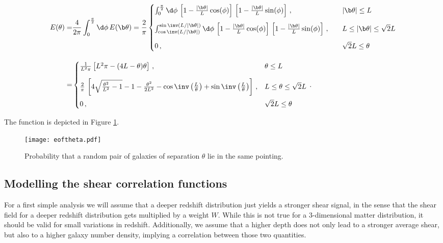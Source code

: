 \begin{align}
E(\theta) = & \frac{4}{2\pi}\int_0^{\frac{\pi}{2}}\d\phi\, E(\b\theta) = \frac{2}{\pi}\begin{cases}
\int_0^{\frac{\pi}{2}} \d\phi\, \left[1-\frac{|\b\theta|}{L}\cos(\phi)\right]\,\left[1-\frac{|\b\theta|}{L}\sin(\phi)\right]\, ,  & |\b\theta|  \leq L \\[10pt]
\int_{\cos\inv(L/|\b\theta|)}^{\sin\inv(L/|\b\theta|)} \d\phi\, \left[1-\frac{|\b\theta|}{L}\cos(\phi)\right]\,\left[1-\frac{|\b\theta|}{L}\sin(\phi)\right] \, , \quad   & L \leq |\b\theta| \leq \sqrt{2}L \\[10pt]
0\, , &\sqrt{2}L \leq\theta
\end{cases} \nonumber\\[10pt]
 = & \begin{cases}
\frac{1}{L^2 \pi}\left[L^2\pi - (4L-\theta) \theta\right]\, ,  & \theta \leq L \\[10pt]
\frac{2}{\pi}\,\left[4\sqrt{\frac{\theta^2}{L^2}-1} -1 - \frac{\theta^2}{2L^2} - \cos\inv\left(\frac{L}{\theta}\right) + \sin\inv\left(\frac{L}{\theta}\right)\right]\, ,  & L  \leq \theta \leq \sqrt{2}L \\[10pt]
0\, ,  & \sqrt{2}L \leq \theta
\end{cases}\, .
\end{align}

The function is depicted in Figure \ref{fig:eoftheta_lin}. 
 
 \begin{figure}
 \centering
 \texttt{[image: eoftheta.pdf]}
 \caption{Probability that a random pair of galaxies of separation $\theta$ lie in the same pointing.}
 \label{fig:eoftheta_lin}
 \end{figure}
\subsection{Modelling the shear correlation functions}
\label{sec:xipm_analytic}
For a first simple analysis we will assume that a deeper redshift distribution just yields a stronger shear signal, in the sense that the shear field for a deeper redshift distribution gets multiplied by a weight $W$. While this is not true for a 3-dimensional matter distribution, it should be valid for small variations in redshift. Additionally, we assume that a higher depth does not only lead to a stronger average shear, but also to a higher galaxy number density, implying a correlation between those two quantities.

